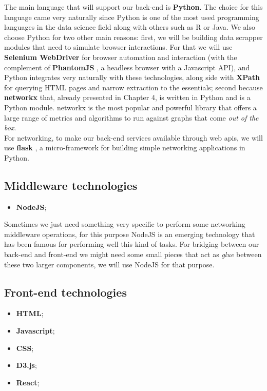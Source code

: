 The main language that will support our back-end is \textbf{Python}. The choice for this language came very naturally since Python is one of the most used programming languages in the data science field along with others such as R or Java. We also choose Python for two other main reasons: first, we will be building data scrapper modules that need to simulate browser interactions.
 For that we will use \textbf{Selenium WebDriver} \citep{documentation2013selenium} for browser automation and interaction (with the complement of \textbf{PhantomJS} \citep{hidayat2013phantomjs}, a headless browser with a Javascript API), and Python integrates very naturally with these technologies, along side with \textbf{XPath} \citep{clark1999xml} for querying HTML pages and narrow extraction to the essentials; second because \textbf{networkx} \citep{hagberg2013networkx} that, already presented in Chapter 4, is written in Python and is a Python module. networkx is the most popular and powerful library that offers a large range of metrics and algorithms to run against graphs that come \textit{out of the box}.\\
\indent For networking, to make our back-end services available through web \glspl{api}, we will use \textbf{flask} \citep{ronacher2015flask}, a micro-framework for building simple networking applications in Python.

\subsection{Middleware technologies}
\begin{itemize}
    \item \textbf{NodeJS};
\end{itemize}

Sometimes we just need something very specific to perform some networking middleware operations, for this purpose NodeJS \citep{nodejs} is an emerging technology
that has been famous for performing well this kind of tasks. For bridging between our back-end and front-end we might need some small pieces that act
as \textit{glue} between these two larger components, we will use NodeJS for that purpose.

\subsection{Front-end technologies}
\begin{itemize}
    \item \textbf{HTML};
    \item \textbf{Javascript};
    \item \textbf{CSS};
    \item \textbf{D3.js};
    \item \textbf{React};
\end{itemize}

